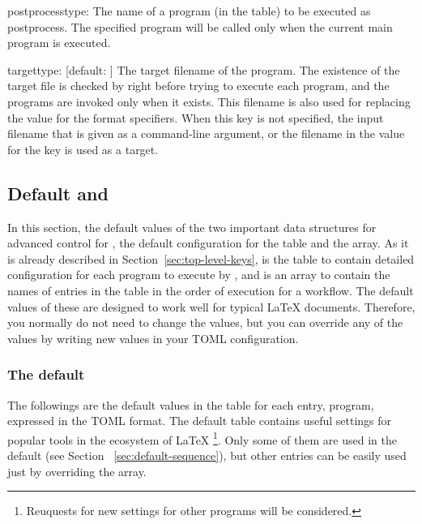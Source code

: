 \documentclass[draft]{llmk-doc}
\begin{document}
\begin{confkey}{postprocess}{type: }
The name of a program (in the  table) to be executed as
postprocess. The specified program will be called only when the current main
program is executed.
\end{confkey}

\begin{confkey}{target}{type: }[default: ]
The target filename of the program. The existence of the target file is checked
by  right before trying to execute each program, and the programs
are invoked only when it exists. This filename is also used for replacing the
value for the format specifiers. When this key is not specified, the input
filename that is given as a command-line argument, or the filename in the value
for the  key is used as a target.
\end{confkey}

\subsection{Default  and }

In this section, the default values of the two important data structures for
advanced control for , \ie the default configuration for the
 table and the  array. As it is already described
in Section~\ref{sec:top-level-keys},  is the table to contain
detailed configuration for each program to execute by , and
 is an array to contain the names of entries in the
 table in the order of execution for a workflow. The default
values of these are designed to work well for typical {\LaTeX} documents.
Therefore, you normally do not need to change the values, but you can override
any of the values by writing new values in your TOML configuration.

\subsubsection{The default }
\label{sec:default-programs}

The followings are the default values in the  table for each
entry, \ie program, expressed in the TOML format. The default 
table contains useful settings for popular tools in the ecosystem of {\LaTeX}%
\footnote{Reuquests for new settings for other programs will be considered.}.
Only some of them are used in the default  (see Section~%
\ref{sec:default-sequence}), but other entries can be easily used just by
overriding the  array.
\end{document}
